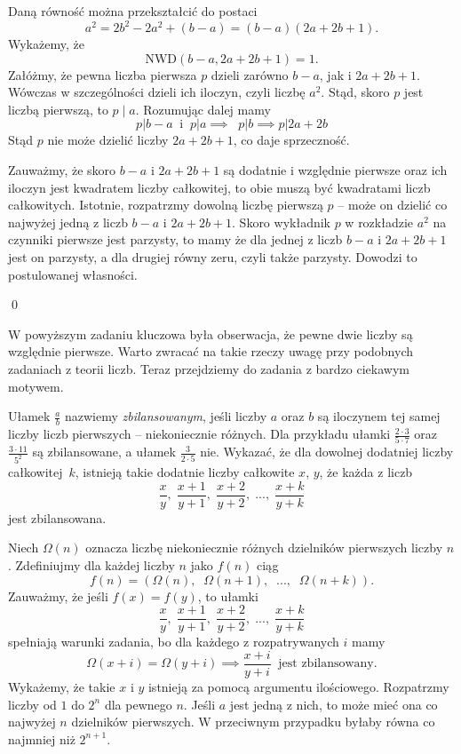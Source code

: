 \noindent
Daną równość można przekształcić do postaci
\[
	a^2 = 2b^2 - 2a^2 + (b - a) = (b - a)(2a + 2b + 1).
\]
Wykażemy, że
\[
	\mathrm{NWD}(b - a, 2a + 2b + 1) = 1.
\]
Załóżmy, że pewna liczba pierwsza $p$ dzieli zarówno $b - a$, jak i $2a + 2b + 1$. Wówczas w szczególności dzieli ich iloczyn, czyli liczbę $a^2$. Stąd, skoro $p$ jest liczbą pierwszą, to $p \mid a$. Rozumując dalej mamy
\[
	 p | b - a \;\; \text{i} \;\; p | a \implies \;\; p | b \implies p|2a + 2b
\]
Stąd $p$ nie może dzielić liczby $2a + 2b + 1$, co daje sprzeczność.

\vspace{10px}
\noindent
Zauważmy, że skoro $b - a$ i $2a + 2b + 1$ są dodatnie i względnie pierwsze oraz ich iloczyn jest kwadratem liczby całkowitej, to obie muszą być kwadratami liczb całkowitych. Istotnie, rozpatrzmy dowolną liczbę pierwszą $p$ -- może on dzielić co najwyżej jedną z liczb $b - a$ i $2a + 2b + 1$. Skoro wykładnik $p$ w rozkładzie $a^2$ na czynniki pierwsze jest parzysty, to mamy że dla jednej z liczb $b - a$ i $2a + 2b + 1$ jest on parzysty, a dla drugiej równy zeru, czyli także parzysty. Dowodzi to postulowanej własności.

\qed

\noindent
W powyższym zadaniu kluczowa była obserwacja, że pewne dwie liczby są względnie pierwsze. Warto zwracać na takie rzeczy uwagę przy podobnych zadaniach z teorii liczb. Teraz przejdziemy do zadania z bardzo ciekawym motywem.

\vspace{10px}


\noindent
Ułamek $\frac{a}{b}$ nazwiemy \textit{zbilansowanym}, jeśli liczby $a$ oraz $b$ są iloczynem tej samej liczby liczb pierwszych -- niekoniecznie różnych. Dla przykładu ułamki $\frac{2 \cdot 3}{5 \cdot 7}$ oraz $\frac{3 \cdot 11}{5^2}$ są zbilansowane, a ułamek $\frac{3}{2 \cdot 5}$ nie. Wykazać, że dla dowolnej dodatniej liczby całkowitej~$k$, istnieją takie dodatnie liczby całkowite $x$, $y$, że każda z liczb
\[
	\frac{x}{y}, \; \frac{x + 1}{y + 1}, \; \frac{x + 2}{y + 2}, \; ..., \; \frac{x + k}{y + k}
\]  
jest zbilansowana.

\vspace{5px}


\noindent
Niech $\Omega(n)$ oznacza liczbę niekoniecznie różnych dzielników pierwszych liczby $n$.
Zdefiniujmy dla każdej liczby $n$ jako $f(n)$ ciąg 
\[
	f(n) = (\Omega(n),\;\; \Omega(n + 1),\;\; ...,\;\; \Omega(n + k)).
\]
Zauważmy, że jeśli $f(x) = f(y)$, to ułamki
\[
	\frac{x}{y}, \; \frac{x + 1}{y + 1}, \; \frac{x + 2}{y + 2}, \; ..., \; \frac{x + k}{y + k}
\]
spełniają warunki zadania, bo dla każdego z rozpatrywanych $i$ mamy
\[
	\Omega(x + i) = \Omega(y + i) \implies \frac{x + i}{y + i} \;\; \text{jest zbilansowany}.
\]
Wykażemy, że takie $x$ i $y$ istnieją za pomocą argumentu ilościowego. Rozpatrzmy liczby od $1$ do $2^n$ dla pewnego $n$. Jeśli $a$ jest jedną z nich, to może mieć ona co najwyżej $n$ dzielników pierwszych. W przeciwnym przypadku byłaby równa co najmniej niż $2^{n + 1}$. 

